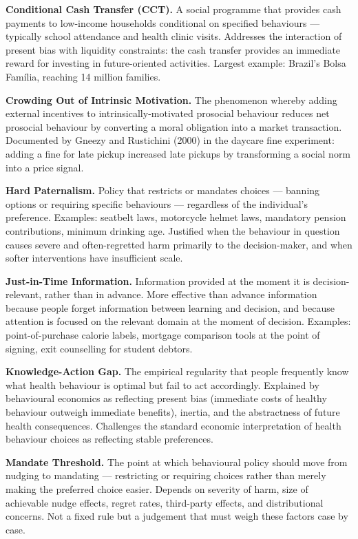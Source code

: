 \documentclass[12pt, letterpaper]{article}
\begin{document}
\textbf{Conditional Cash Transfer (CCT).} A social programme that provides cash payments to low-income households conditional on specified behaviours --- typically school attendance and health clinic visits. Addresses the interaction of present bias with liquidity constraints: the cash transfer provides an immediate reward for investing in future-oriented activities. Largest example: Brazil's Bolsa Família, reaching 14 million families.

\textbf{Crowding Out of Intrinsic Motivation.} The phenomenon whereby adding external incentives to intrinsically-motivated prosocial behaviour reduces net prosocial behaviour by converting a moral obligation into a market transaction. Documented by Gneezy and Rustichini (2000) in the daycare fine experiment: adding a fine for late pickup increased late pickups by transforming a social norm into a price signal.

\textbf{Hard Paternalism.} Policy that restricts or mandates choices --- banning options or requiring specific behaviours --- regardless of the individual's preference. Examples: seatbelt laws, motorcycle helmet laws, mandatory pension contributions, minimum drinking age. Justified when the behaviour in question causes severe and often-regretted harm primarily to the decision-maker, and when softer interventions have insufficient scale.

\textbf{Just-in-Time Information.} Information provided at the moment it is decision-relevant, rather than in advance. More effective than advance information because people forget information between learning and decision, and because attention is focused on the relevant domain at the moment of decision. Examples: point-of-purchase calorie labels, mortgage comparison tools at the point of signing, exit counselling for student debtors.

\textbf{Knowledge-Action Gap.} The empirical regularity that people frequently know what health behaviour is optimal but fail to act accordingly. Explained by behavioural economics as reflecting present bias (immediate costs of healthy behaviour outweigh immediate benefits), inertia, and the abstractness of future health consequences. Challenges the standard economic interpretation of health behaviour choices as reflecting stable preferences.

\textbf{Mandate Threshold.} The point at which behavioural policy should move from nudging to mandating --- restricting or requiring choices rather than merely making the preferred choice easier. Depends on severity of harm, size of achievable nudge effects, regret rates, third-party effects, and distributional concerns. Not a fixed rule but a judgement that must weigh these factors case by case.
\end{document}
